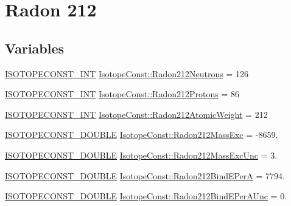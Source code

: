 \hypertarget{group___isotope_const-_radon-_rn212}{}\section{Radon 212}
\label{group___isotope_const-_radon-_rn212}
\subsection*{Variables}
\begin{DoxyCompactItemize}
\item 
\mbox{\hyperlink{group___isotope_const-_macros_ga5f18360b3e99483a35c32d789e62621c}{I\+S\+O\+T\+O\+P\+E\+C\+O\+N\+S\+T\+\_\+\+I\+NT}} \mbox{\hyperlink{group___isotope_const-_radon-_rn212_ga564905b9a907c1fc236e45ffe255403a}{Isotope\+Const\+::\+Radon212\+Neutrons}} = 126
\item 
\mbox{\hyperlink{group___isotope_const-_macros_ga5f18360b3e99483a35c32d789e62621c}{I\+S\+O\+T\+O\+P\+E\+C\+O\+N\+S\+T\+\_\+\+I\+NT}} \mbox{\hyperlink{group___isotope_const-_radon-_rn212_ga8a5ffb623f5ee01fe338a7ad133cea25}{Isotope\+Const\+::\+Radon212\+Protons}} = 86
\item 
\mbox{\hyperlink{group___isotope_const-_macros_ga5f18360b3e99483a35c32d789e62621c}{I\+S\+O\+T\+O\+P\+E\+C\+O\+N\+S\+T\+\_\+\+I\+NT}} \mbox{\hyperlink{group___isotope_const-_radon-_rn212_ga380561c7edd25cd1b608864b1791a07d}{Isotope\+Const\+::\+Radon212\+Atomic\+Weight}} = 212
\item 
\mbox{\hyperlink{group___isotope_const-_macros_ga8f45a7272ce02c0b4c65c44636ed719a}{I\+S\+O\+T\+O\+P\+E\+C\+O\+N\+S\+T\+\_\+\+D\+O\+U\+B\+LE}} \mbox{\hyperlink{group___isotope_const-_radon-_rn212_ga01bdef692291711cb91d6ea26b68a814}{Isotope\+Const\+::\+Radon212\+Mass\+Exc}} = -\/8659.
\item 
\mbox{\hyperlink{group___isotope_const-_macros_ga8f45a7272ce02c0b4c65c44636ed719a}{I\+S\+O\+T\+O\+P\+E\+C\+O\+N\+S\+T\+\_\+\+D\+O\+U\+B\+LE}} \mbox{\hyperlink{group___isotope_const-_radon-_rn212_ga42381bb51121e35d8737e559b81a4b71}{Isotope\+Const\+::\+Radon212\+Mass\+Exc\+Unc}} = 3.
\item 
\mbox{\hyperlink{group___isotope_const-_macros_ga8f45a7272ce02c0b4c65c44636ed719a}{I\+S\+O\+T\+O\+P\+E\+C\+O\+N\+S\+T\+\_\+\+D\+O\+U\+B\+LE}} \mbox{\hyperlink{group___isotope_const-_radon-_rn212_ga2285d492092ede030d7979dd220a3857}{Isotope\+Const\+::\+Radon212\+Bind\+E\+PerA}} = 7794.
\item 
\mbox{\hyperlink{group___isotope_const-_macros_ga8f45a7272ce02c0b4c65c44636ed719a}{I\+S\+O\+T\+O\+P\+E\+C\+O\+N\+S\+T\+\_\+\+D\+O\+U\+B\+LE}} \mbox{\hyperlink{group___isotope_const-_radon-_rn212_gad98e7a1075f2980917b0449e4e43c15d}{Isotope\+Const\+::\+Radon212\+Bind\+E\+Per\+A\+Unc}} = 0.

\end{DoxyCompactItemize}
